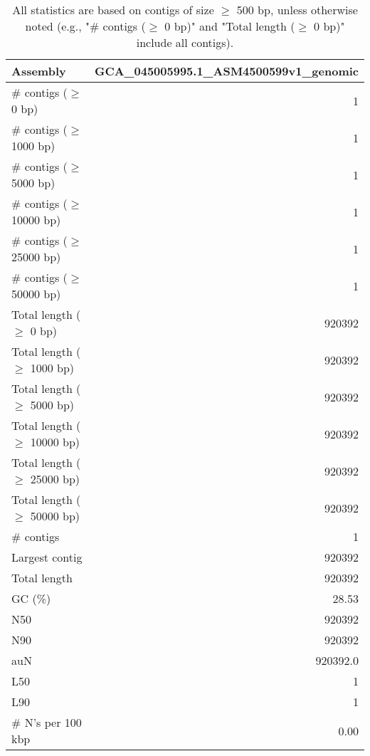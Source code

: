 \documentclass[12pt,a4paper]{article}
\begin{document}
\begin{table}[ht]
\begin{center}
\caption{All statistics are based on contigs of size $\geq$ 500 bp, unless otherwise noted (e.g., "\# contigs ($\geq$ 0 bp)" and "Total length ($\geq$ 0 bp)" include all contigs).}
\begin{tabular}{|l*{1}{|r}|}
\hline
Assembly & GCA\_045005995.1\_ASM4500599v1\_genomic \\ \hline
\# contigs ($\geq$ 0 bp) & 1 \\ \hline
\# contigs ($\geq$ 1000 bp) & 1 \\ \hline
\# contigs ($\geq$ 5000 bp) & 1 \\ \hline
\# contigs ($\geq$ 10000 bp) & 1 \\ \hline
\# contigs ($\geq$ 25000 bp) & 1 \\ \hline
\# contigs ($\geq$ 50000 bp) & 1 \\ \hline
Total length ($\geq$ 0 bp) & 920392 \\ \hline
Total length ($\geq$ 1000 bp) & 920392 \\ \hline
Total length ($\geq$ 5000 bp) & 920392 \\ \hline
Total length ($\geq$ 10000 bp) & 920392 \\ \hline
Total length ($\geq$ 25000 bp) & 920392 \\ \hline
Total length ($\geq$ 50000 bp) & 920392 \\ \hline
\# contigs & 1 \\ \hline
Largest contig & 920392 \\ \hline
Total length & 920392 \\ \hline
GC (\%) & 28.53 \\ \hline
N50 & 920392 \\ \hline
N90 & 920392 \\ \hline
auN & 920392.0 \\ \hline
L50 & 1 \\ \hline
L90 & 1 \\ \hline
\# N's per 100 kbp & 0.00 \\ \hline
\end{tabular}
\end{center}
\end{table}
\end{document}
